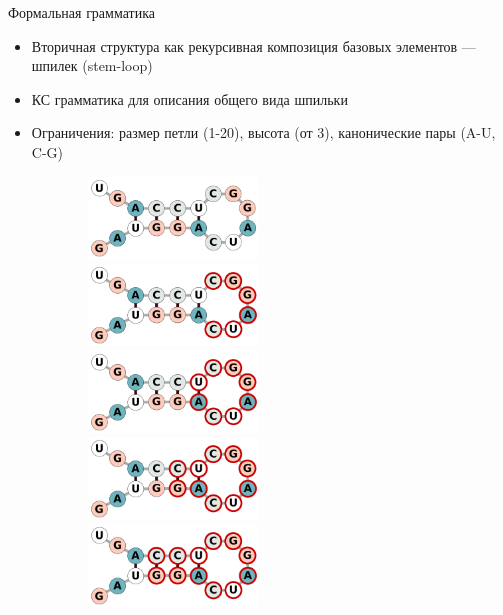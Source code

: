 \documentclass{beamer}
\begin{document}
\begin{frame}[fragile]{Формальная грамматика}
\begin{itemize}
    \item Вторичная структура как рекурсивная композиция базовых элементов --- шпилек (stem-loop)
    \item КС грамматика для описания общего вида шпильки
    \item Ограничения: размер петли (1-20), высота (от 3), канонические пары (A-U, C-G)
\end{itemize}

\vspace{6mm}

\begin{figure}
    \centering
    \begin{subfigure}{.47\textwidth}
        \centering
        \begin{overprint}
            \includegraphics[width=4.5cm]{pics/stem.pdf}
            \includegraphics[width=4.5cm]{pics/stem_2.pdf}
            \includegraphics[width=4.5cm]{pics/stem_3.pdf}
            \includegraphics[width=4.5cm]{pics/stem_4.pdf}
            \includegraphics[width=4.5cm]{pics/stem_5.pdf}

\end{overprint}
\end{subfigure}
\end{figure}
\end{frame}
\end{document}
